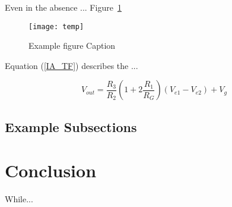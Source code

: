 \documentclass[conference]{./templates/IEEEtran}
\begin{document}
	Even in the absence ... Figure~\ref{myfig}
	
	\begin{figure}[!b] %
		\centering
		\texttt{[image: temp]}
		\caption{Example figure Caption}
		\label{myfig}
	\end{figure}
	
	Equation (\ref{IA_TF}) describes the ...
	
	\begin{equation}
		V_{out} = \frac{R_3}{R_2}\left(1+2\frac{R_1}{R_G}\right)(V_{e1}-V_{e2})+V_g
		\label{IA_TF}
	\end{equation}
	
	\newpage %
	
	\subsection{Example Subsections}
	
	\section{Conclusion} %
	
	While...
	
	\clearpage
	\nocite{*} %
	
	
\end{document}
